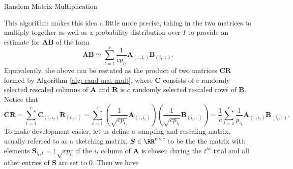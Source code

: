 {\centering
\begin{minipage}{.85\linewidth}
    \begin{algorithm}[H]
        \caption{Random Matrix Multiplication}
        \label{alg: rand-mat-mult}
        \SetAlgoLined
        \DontPrintSemicolon

        \BlankLine
        \BlankLine
    \end{algorithm}
\end{minipage}
\par}
This algorithm makes this idea a little more precise, taking in the two matrices to multiply together as well as a probability distribution over $I$ to provide an estimate for $\bm{A}\bm{B}$ of the form
\begin{equation*}
    \bm{A}\bm{B} \simeq \sum_{t=1}^{c} \frac{1}{cp_{i_t}} \bm{A}_{(:,i_t)} \bm{B}_{(i_t,:)}.
\end{equation*}
Equivalently, the above can be restated as the product of two matrices $\bm{C} \bm{R}$ formed by Algorithm \ref{alg: rand-mat-mult}, where $\bm{C}$ consists of $c$ randomly selected rescaled columns of $\bm{A}$ and $\bm{R}$ is $c$ randomly selected rescaled rows of $\bm{B}$. Notice that
\begin{equation*}
    \bm{C} \bm{R} = \sum_{t=1}^{c} \bm{C}_{(:,i_t)} \bm{R}_{(i_t,:)} = \sum_{t=1}^{c} \left( \frac{1}{\sqrt{cp_{i_t}}} \bm{A}_{(:,i_t)} \right) \left( \frac{1}{\sqrt{cp_{i_t}}} \bm{B}_{(i_t,:)} \right) = \frac{1}{c} \sum_{t=1}^{c} \frac{1}{p_{i_t}} \bm{A}_{(:,i_t)} \bm{B}_{(i_t,:)}.
\end{equation*}
To make development easier, let us define a sampling and rescaling matrix, usually referred to as a sketching matrix, $\bm{S} \in \RR^{n \times c}$ to be the the matrix with elements $\bm{S}_{i_t , t} = 1 \sqrt{c p_{i_t}}$ if the $i_t$ column of $\bm{A}$ is chosen during the $t^{th}$ trial and all other entries of $\bm{S}$ are set to $0$. Then we have
